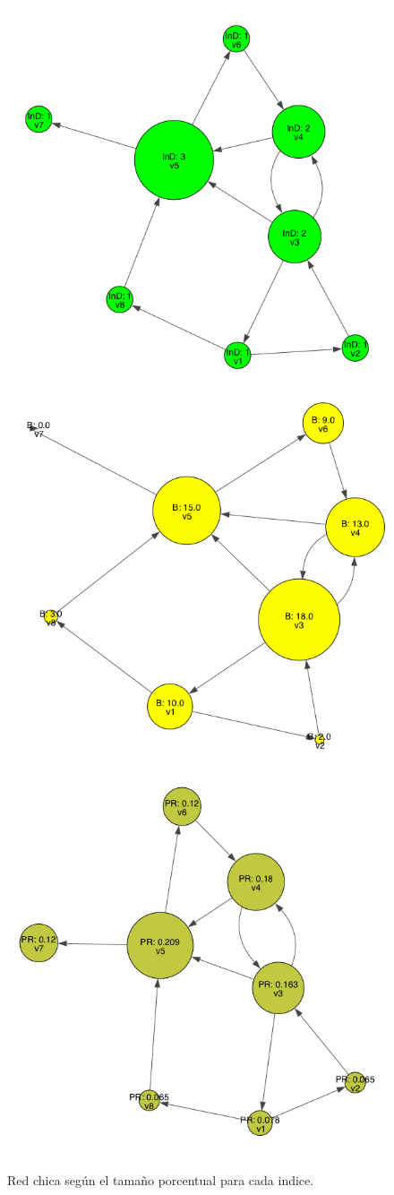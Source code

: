 \documentclass[letterpaper]{article}
\begin{document}
\begin{figure}[H]
  \centering
  \includegraphics[width=.32\linewidth]{img/p4-indegree.png}\hfill
  \includegraphics[width=.32\linewidth]{img/p4-betweenness.png}\hfill
  \includegraphics[width=.32\linewidth]{img/p4-pageranks.png}
  \caption{Red chica según el tamaño porcentual para cada indice.}
  \label{red:4-all}
\end{figure}
\end{document}
